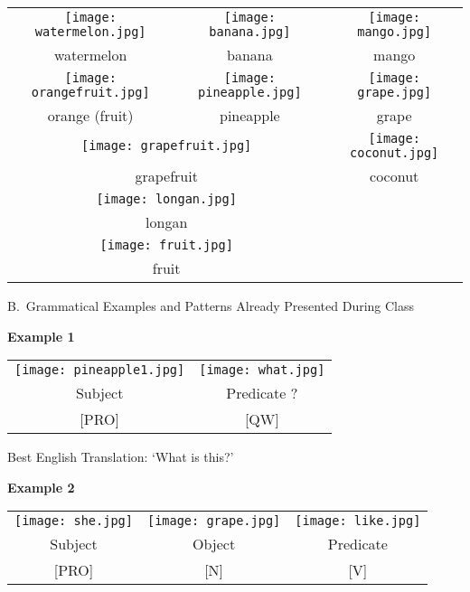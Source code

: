 \documentclass{tufte-book}
\begin{document}
\begin{table*}[h!]
\begin{tabular}{c c c}
\texttt{[image: watermelon.jpg]}&\texttt{[image: banana.jpg]}&\texttt{[image: mango.jpg]}\\
\footnotesize watermelon & \footnotesize banana & \footnotesize mango\\
\texttt{[image: orangefruit.jpg]}&\texttt{[image: pineapple.jpg]}&\texttt{[image: grape.jpg]}\\
\footnotesize orange (fruit) & \footnotesize pineapple & \footnotesize grape\\
\multicolumn{2}{c}{\texttt{[image: grapefruit.jpg]}}& \texttt{[image: coconut.jpg]}\\
\multicolumn{2}{c}{\footnotesize  grapefruit}&\footnotesize  coconut\\
\multicolumn{2}{c}{\texttt{[image: longan.jpg]}}& \\
\multicolumn{2}{c}{\footnotesize  longan}&\\
\multicolumn{2}{c}{\texttt{[image: fruit.jpg]}}& \\
\multicolumn{2}{c}{\footnotesize  fruit}&\\


\end{tabular}
\end{table*}
\newpage

\noindent B.~Grammatical Examples and Patterns Already Presented During Class

\vspace{0.25cm}\noindent \textbf{Example 1}
\begin{table*}[h!]
\begin{tabular}{c | c }
\texttt{[image: pineapple1.jpg]}&\texttt{[image: what.jpg]}\\
\footnotesize Subject & \footnotesize Predicate ?\\
\footnotesize [PRO] & \footnotesize [QW]\\
\end{tabular}
\end{table*}

Best English Translation: `What is this?'

\vspace{0.25cm}\noindent \textbf{Example 2}
\begin{table*}[h!]
\begin{tabular}{c | c| c}
\texttt{[image: she.jpg]}&\texttt{[image: grape.jpg]}&\texttt{[image: like.jpg]}\\
\footnotesize Subject & \footnotesize Object & \footnotesize Predicate\\
\footnotesize [PRO] & \footnotesize [N] & \footnotesize [V]\\
\end{tabular}
\end{table*}
\end{document}

